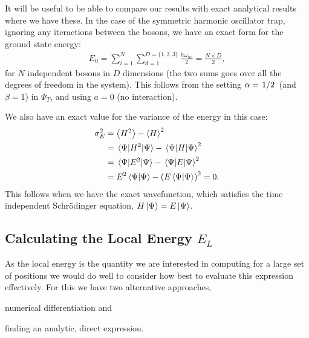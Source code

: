 \documentclass[twocolumn]{article}
\begin{document}
It will be useful to be able to compare our results with exact analytical
results where we have these. In the case of the symmetric harmonic oscillator
trap, ignoring any iteractions between the bosons, we have an exact form for the
ground state energy:
\begin{align}
    E_0 = \sum_{i=1}^N\sum_{d=1}^{D=\{1,2,3\}} \frac{\hbar \omega_{ho}}{2} 
    = \frac{N\times D}{2},\label{eq:exact-ground-state}
\end{align}
for $N$ independent bosons in $D$ dimensions (the two sums goes
over all the degrees of freedom in the system). This follows from the setting
$\alpha=\flatfrac{1}{2}$ (and $\beta=1$) in $\Psi_T$, and using $a=0$ (no
interaction). 

We also have an exact value for the variance of the energy in this case:
\begin{align}
    \begin{split}
        \sigma_E^2 &= \expval{H^2} - \expval{H}^2\\
            &= \expval{H^2}{\Psi}-\expval{H}{\Psi}^2\\
            &= \expval{E^2}{\Psi}-\expval{E}{\Psi}^2\\
            &= E^2\braket{\Psi} - \qty(E\braket{\Psi})^2= 0.
    \end{split}\label{eq:var-zero-when-exact}
\end{align}
This follows when we have the exact wavefunction, which satisfies the time
independent Schrödinger equation, $H\ket{\Psi}=E\ket{\Psi}$.

\subsection{Calculating the Local Energy $E_L$}
As the local energy is the quantity we are interested in computing for a
large set of positions we would do well to consider how best to evaluate this
expression effectively. For this we have two alternative approaches,
\begin{inparaenum}[1)]
    \item numerical differentiation and
    \item finding an analytic, direct expression.
\end{inparaenum}
\end{document}
